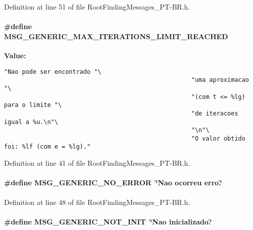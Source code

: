 Definition at line 51 of file RootFindingMessages\_\-PT-BR.h.\hypertarget{group____messages_g07f4e1141d65130c4dad0a273735d81e}{
\paragraph[MSG\_\-GENERIC\_\-MAX\_\-ITERATIONS\_\-LIMIT\_\-REACHED]{\setlength{\rightskip}{0pt plus 5cm}\#define MSG\_\-GENERIC\_\-MAX\_\-ITERATIONS\_\-LIMIT\_\-REACHED}\hfill}
\label{group____messages_g07f4e1141d65130c4dad0a273735d81e}


\textbf{Value:}

\begin{Code}\begin{verbatim}"Nao pode ser encontrado "\
                                                    "uma aproximacao "\
                                                    "(com t <= %lg) para o limite "\
                                                    "de iteracoes igual a %u.\n"\
                                                    "\n"\
                                                    "O valor obtido foi: %lf (com e = %lg)."
\end{verbatim}
\end{Code}


Definition at line 41 of file RootFindingMessages\_\-PT-BR.h.\hypertarget{group____messages_gc4f8d165b6144573adc8ce2776826c49}{
\paragraph[MSG\_\-GENERIC\_\-NO\_\-ERROR]{\setlength{\rightskip}{0pt plus 5cm}\#define MSG\_\-GENERIC\_\-NO\_\-ERROR~\char`\"{}Nao ocorreu erro.\char`\"{}}\hfill}
\label{group____messages_gc4f8d165b6144573adc8ce2776826c49}




Definition at line 48 of file RootFindingMessages\_\-PT-BR.h.\hypertarget{group____messages_gb9e27a0fd9a540c07295263a8daa57e1}{
\paragraph[MSG\_\-GENERIC\_\-NOT\_\-INIT]{\setlength{\rightskip}{0pt plus 5cm}\#define MSG\_\-GENERIC\_\-NOT\_\-INIT~\char`\"{}Nao inicializado.\char`\"{}}\hfill}
\label{group____messages_gb9e27a0fd9a540c07295263a8daa57e1}




